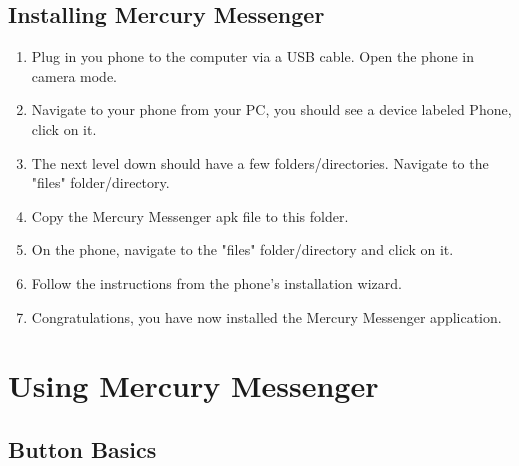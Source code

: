 \documentclass{article}
\begin{document}
\subsection{Installing Mercury Messenger}
\begin{enumerate}
\item Plug in you phone to the computer via a USB cable. Open the phone in camera mode.
\item Navigate to your phone from your PC, you should see a device labeled Phone, click on it.
\item The next level down should have a few folders/directories. Navigate to the "files" folder/directory.
\item Copy the Mercury Messenger apk file to this folder.
\item On the phone, navigate to the "files" folder/directory and click on it.
\item Follow the instructions from the phone's installation wizard.
\item Congratulations, you have now installed the Mercury Messenger application.
\end{enumerate}






\section{Using Mercury Messenger}
\label{sec:UsingMercMess}

\subsection{Button Basics}
\end{document}
